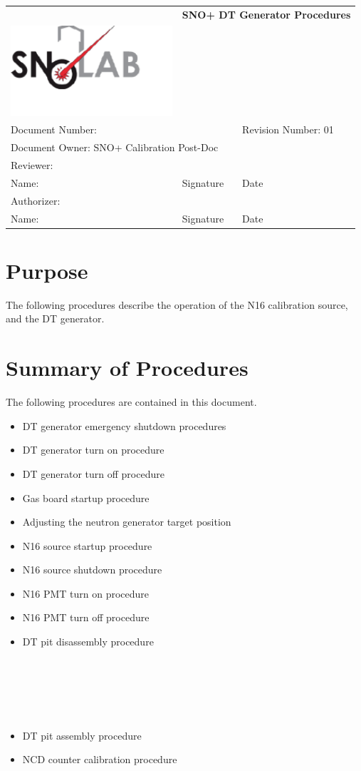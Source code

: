 \documentclass[10pt]{article}
\begin{document}
\begin{tabular}{||l|l|l||}
\hline\hline
& \multicolumn{2}{p{8cm}||}{\bf SNO+ DT Generator Procedures} \\
\includegraphics[width=6cm]{../snolablogo.pdf} & \multicolumn{2}{p{8cm}||}{} \\
\hline
\multicolumn{2}{||p{8.5cm}|}{Document Number:} & Revision Number: 01\\
\hline
\multicolumn{3}{||l||}{Document Owner: SNO+ Calibration Post-Doc} \\
\hline
\multicolumn{3}{||l||}{Reviewer:}\\
\hline
Name: & Signature & Date \\
\hline
\multicolumn{3}{||l||}{Authorizer:}\\
\hline
Name: & Signature & Date \\
\hline\hline
\end{tabular}
\thispagestyle{empty}

\section{Purpose}

The following procedures describe the operation of the N16 calibration source, and the DT generator. 

\section{Summary of Procedures}

The following procedures are contained in this document.

\begin{itemize}
\item DT generator emergency shutdown procedures
\item DT generator turn on procedure
\item DT generator turn off procedure
\item Gas board startup procedure
\item Adjusting the neutron generator target position
\item N16 source startup procedure
\item N16 source shutdown procedure
\item N16 PMT turn on procedure
\item N16 PMT turn off procedure
\item DT pit disassembly procedure \\ \\ \\ \\ \\ \\
\item DT pit assembly procedure 
\item NCD counter calibration procedure
\end{itemize} 
\end{document}
